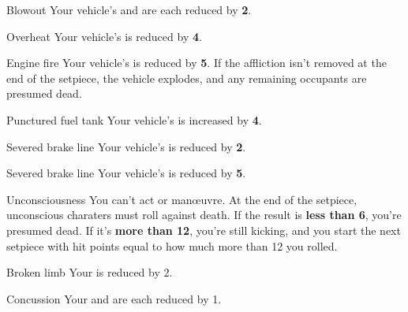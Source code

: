
\begin{describe}{Blowout}
  Your vehicle's  and  are each reduced by \textbf{2}.
\end{describe}

\begin{describe}{Overheat}
  Your vehicle's  is reduced by \textbf{4}.
\end{describe}

\begin{describe}{Engine fire}
  Your vehicle's  is reduced by \textbf{5}. If the affliction isn't removed at the end of the setpiece, the vehicle explodes, and any remaining occupants are presumed dead.
\end{describe}

\begin{describe}{Punctured fuel tank}
  Your vehicle's  is increased by \textbf{4}.
\end{describe}

\begin{describe}{Severed brake line}
  Your vehicle's  is reduced by \textbf{2}.
\end{describe}

\begin{describe}{Severed brake line}
  Your vehicle's  is reduced by \textbf{5}.
\end{describe}

\hr

\begin{describe}{Unconsciousness}
  You can't act or man\oe{}uvre. At the end of the setpiece, unconscious charaters must roll  against death. If the result is \textbf{less than 6}, you're presumed dead. If it's \textbf{more than 12}, you're still kicking, and you start the next setpiece with hit points equal to how much more than 12 you rolled.
\end{describe}

\begin{describe}{Broken limb}
  Your  is reduced by 2.
\end{describe}

\begin{describe}{Concussion}
  Your  and  are each reduced by 1.
\end{describe}

